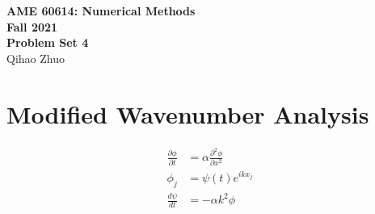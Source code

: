 \documentclass[letterpaper,10pt]{article}
\begin{document}
\fancyhf{}
\fancyfoot[C]{\thepage}

\thispagestyle{plain}
\begin{center}
  \large
  \textbf{AME 60614: Numerical Methods} \\
  \textbf{Fall 2021} \\
  \vspace{0.5em}
  \textbf{Problem Set 4} \\
  \vspace{1em}
  Qihao Zhuo
\end{center}

\vspace{1.5em}

\section{Modified Wavenumber Analysis}
\begin{align*}
  \frac{\partial \phi}{\partial t}&=\alpha \frac{\partial^2 \phi}{\partial x^2}\\
  \phi_j &= \psi(t)e^{ikx_j}\\
  \frac{d\psi}{dt}&=-\alpha k^2 \phi
\end{align*}
\end{document}
